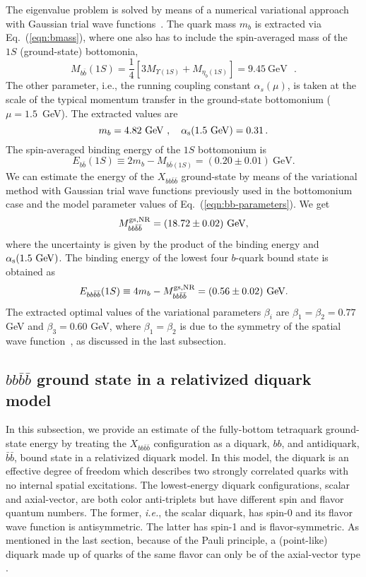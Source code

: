\documentclass[twocolumn,showpacs,superscriptaddress,preprintnumbers,nofootinbib,prd]{revtex4-1}
\def\be{\begin{equation}}
\def\ee{\end{equation}}
\begin{document}
The eigenvalue problem is solved by means of a numerical variational
approach with Gaussian trial wave functions~\cite{Hwang:1995uy,Naeem12}.
The quark mass $m_b$ is extracted via Eq.~(\ref{eqn:bmass}), where one
also has to include the spin-averaged mass of the $1S$ (ground-state) bottomonia,
\be
M_{b\bar{b}}(1S)=\frac{1}{4}\left[3M_{\Upsilon(1S)}+M_{\eta_{b}(1S)}\right] = 9.45~\textrm{GeV}
\mbox{ }.
\ee
The other parameter, i.e., the running coupling constant $\alpha_s(\mu)$,
is taken at the scale of the typical momentum transfer in the ground-state bottomonium
($\mu=1.5$~GeV).
The extracted values are
\be
\label{eqn:bb-parameters}
m_b=4.82~\text{GeV} ~, ~~~\alpha_{\rm s}(1.5~{\rm GeV})=0.31\,.
\ee
The spin-averaged binding energy of the $1S$ bottomonium is
\be
\label{eqn:B-bb}
E_{b\bar{b}}(1S) \equiv 2 m_b - M_{b\bar b (1S)} =(0.20\pm0.01)~\textrm{GeV}.
\ee
We can estimate the energy of the $X_{bb\bar{b}\bar{b}}$ ground-state by means of
the variational method with Gaussian trial wave functions previously used in the
bottomonium case and the model parameter values of Eq.~(\ref{eqn:bb-parameters}). We get
\begin{equation}
         \label{eqn:M-bbbb}
	M_{b b \bar b \bar b}^{\rm gs, NR} = (18.72\pm0.02) \mbox{ GeV},
\end{equation}
where the uncertainty is given by the product of the binding energy and $\alpha_{\rm s}(1.5~{\rm GeV})$.
The binding energy of the lowest four $b$-quark bound state is obtained as
\be
\label{eqn:B-bbbb}
E_{bb\bar{b}\bar{b}}(1S) \equiv 4 m_b - M_{b b \bar b \bar b}^{\rm gs, NR}
= (0.56\pm0.02)~\textrm{GeV}.
\ee
The extracted optimal values of the variational parameters $\beta_i$ are
$\beta_1=\beta_2= 0.77$ GeV and $\beta_3= 0.60$ GeV, where $\beta_1=\beta_2$
is due to the symmetry of the spatial wave function~\cite{Hylleraas:1947zza},
as discussed in the last subsection.



\subsection{$b b \bar b \bar b$ ground state in a relativized diquark model}
\label{bbbb relativized}

In this subsection, we provide an estimate of the fully-bottom tetraquark
ground-state energy by treating the $X_{b b \bar b \bar b}$ configuration
as a diquark, $bb$, and antidiquark, $\bar b \bar b$, bound state in a relativized diquark model.
In this model, the diquark is an effective degree of freedom which describes two strongly
correlated quarks with no internal spatial excitations.
The lowest-energy diquark configurations, scalar and axial-vector, are both
color anti-triplets but have different spin and flavor quantum numbers.
The former, {\it i.e.}, the scalar diquark, has spin-0 and its flavor wave
function is antisymmetric. The latter has spin-1 and is flavor-symmetric.
As mentioned in the last section, because of the Pauli principle, a (point-like) diquark made up of quarks
of the same flavor can only be of the axial-vector type \cite{Debastiani:2017msn,Jaffe:2004ph}.
\end{document}
